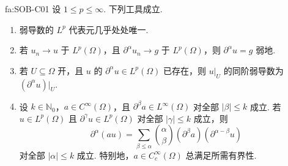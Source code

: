 \begin{FAProposition}{fa:SOB-C01}
设 \(\displaystyle1\leqslant p\leqslant\infty\). 下列工具成立.
\begin{enumerate}[label=\textup{(\alph*)}]
\item 弱导数的 \(\displaystyle L^p\) 代表元几乎处处唯一.
\item 若 \(\displaystyle u_n\to u\) 于 \(\displaystyle L^p(\Omega)\)，且 \(\displaystyle\partial^\alpha u_n\to g\) 于 \(\displaystyle L^p(\Omega)\)，则 \(\displaystyle\partial^\alpha u=g\) 弱地.
\item 若 \(\displaystyle U\subseteq\Omega\) 开，且 \(\displaystyle u\) 的 \(\displaystyle\partial^\alpha u\in L^p(\Omega)\) 已存在，则 \(\displaystyle u|_U\) 的同阶弱导数为 \(\displaystyle(\partial^\alpha u)|_U\).
\item 设 \(\displaystyle k\in\mathbb N_0\)，\(\displaystyle a\in C^\infty(\Omega)\)，且 \(\displaystyle\partial^\beta a\in L^\infty(\Omega)\) 对全部 \(\displaystyle|\beta|\leqslant k\) 成立. 若 \(\displaystyle u\in L^p(\Omega)\) 且 \(\displaystyle\partial^\gamma u\in L^p(\Omega)\) 对全部 \(\displaystyle|\gamma|\leqslant k\) 成立，则
\[
\partial^\alpha(au)
=
\sum_{\beta\leqslant\alpha}
\binom{\alpha}{\beta}
(\partial^\beta a)(\partial^{\alpha-\beta}u)
\]
对全部 \(\displaystyle|\alpha|\leqslant k\) 成立. 特别地，\(\displaystyle a\in C_c^\infty(\Omega)\) 总满足所需有界性.
\end{enumerate}
\end{FAProposition}

